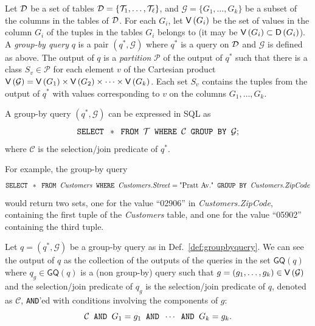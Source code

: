 \begin{definition}\label{def:groupbyquery}
  Let ${\cal D}$ be a set of tables ${\cal D}=\{{\cal T}_1,\dotsc,{\cal T}_\ell\}$, and
  $\mathcal{G}=\{G_1,\dotsc,G_k\}$ be a subset of the columns in the tables of ${\cal D}$. For
  each $G_i$, let $\mathsf{V}\left(G_i\right)$ be the set of values in the column
  $G_i$ of the tuples in the tables $G_i$ belongs to (it may be $\mathsf{V}\left(G_i\right)\subset
  \mathsf{D}\left(G_i\right)$). A \emph{group-by query} $q$ is a pair $(q^*,\mathcal{G})$ where $q^*$ is a query
  on ${\cal D}$ and $\mathcal{G}$ is defined as above.  The output of $q$ is a
  \emph{partition} $\mathcal{P}$ of the output of $q^*$ such that there is a
  class $S_v\in\mathcal{P}$ for each element $v$ of the Cartesian product
  $\mathsf{V}\left(\mathcal{G}\right)=\mathsf{V}\left(G_1\right)\times \mathsf{V}\left(G_2\right)\times\dotsb\times
  \mathsf{V}\left(G_k\right)$. Each set $S_v$ contains the tuples from the output of $q^*$
  with values corresponding to $v$ on the columns $G_1,\dotsc,G_k$.

  A group-by query $(q^*,\mathcal{G})$ can be expressed in SQL as
  \[
  \mbox{\texttt{SELECT }} * \mbox{\texttt{ FROM }} {\cal T} \mbox{\texttt{ WHERE }} \mathcal{C} \mbox{\texttt{ GROUP BY }} \mathcal{G};
   \]
  where $\mathcal{C}$ is the selection/join predicate of $q^*$.
\end{definition}
For example, the group-by query
\[
\mbox{\texttt{SELECT }} * \mbox{\texttt{ FROM }} \mbox{\emph{Customers}}  \mbox{\texttt{ WHERE }} \mbox{\emph{Customers.Street}} =
\mbox{"Pratt Av."} \mbox{\texttt{ GROUP BY }} \mbox{\emph{Customers.ZipCode}}
\]
would return two sets, one for the value ``02906'' in \emph{Customers.ZipCode},
containing the first tuple of the \emph{Customers}
table, and one for the value ``05902'' containing the third tuple.

\begin{fact}\label{fact:groupbyequiv}
  Let $q=(q^*,\mathcal{G})$ be a group-by query as in Def.~\ref{def:groupbyquery}. 
  We can see the output of $q$ as the collection of the outputs of the queries
  in the set $\mathsf{GQ}(q)$ where $q_g\in \mathsf{GQ}(q)$ is a (non group-by)
  query such that $g=(g_1,\dotsc,g_k)\in \mathsf{V}\left(\mathcal{G}\right)$ and the
  selection/join predicate of $q_g$ is the selection/join predicate of $q$,
  denoted as $\mathcal{C}$, \texttt{AND}'ed with conditions involving the
  components of $g$:
  \begin{equation}\label{eq:groupbyequiv}
    \mathcal{C} \mbox{\texttt{ AND }} G_1=g_1 \mbox{\texttt{ AND }} \dotsb \mbox{\texttt{ AND }} G_k=g_k.
  \end{equation}
\end{fact}

